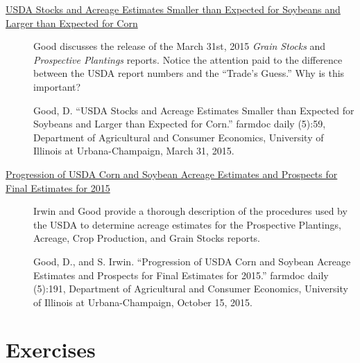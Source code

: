 \documentclass[
]{book}
\begin{document}
\begin{description}
\item[\href{http://farmdocdaily.illinois.edu/2015/03/usda-stocks-and-acreage-estimates-for-soybeans-and-corn.html}{USDA Stocks and Acreage Estimates Smaller than Expected for Soybeans and Larger than Expected for Corn}]
Good discusses the release of the March 31st, 2015 \emph{Grain Stocks} and \emph{Prospective Plantings} reports. Notice the attention paid to the difference between the USDA report numbers and the ``Trade's Guess.'' Why is this important?

Good, D. ``USDA Stocks and Acreage Estimates Smaller than Expected for Soybeans and Larger than Expected for Corn.'' farmdoc daily (5):59, Department of Agricultural and Consumer Economics, University of Illinois at Urbana-Champaign, March 31, 2015.
\item[\href{http://farmdocdaily.illinois.edu/2015/10/progression-usda-corn-and-soybean-acreage-estimates.html}{Progression of USDA Corn and Soybean Acreage Estimates and Prospects for Final Estimates for 2015}]
Irwin and Good provide a thorough description of the procedures used by the USDA to determine acreage estimates for the Prospective Plantings, Acreage, Crop Production, and Grain Stocks reports.

Good, D., and S. Irwin. ``Progression of USDA Corn and Soybean Acreage Estimates and Prospects for Final Estimates for 2015.'' farmdoc daily (5):191, Department of Agricultural and Consumer Economics, University of Illinois at Urbana-Champaign, October 15, 2015.
\end{description}

\hypertarget{exercises-1}{%
\section{Exercises}\label{exercises-1}}
\end{document}
